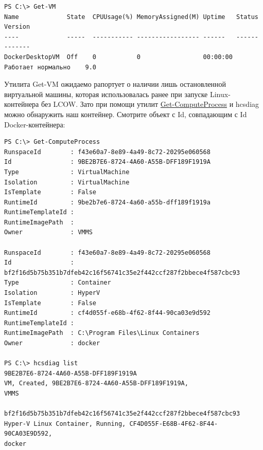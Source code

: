 \documentclass[14pt, a4paper]{article}
\begin{document}
\begin{lstlisting}[basicstyle=\fontsize{8}{13}\selectfont\ttfamily, numberstyle=\color{152, 104, 1}]
PS C:\> Get-VM
Name             State  CPUUsage(%) MemoryAssigned(M) Uptime   Status             Version
----             -----  ----------- ----------------- ------   ------             -------
DockerDesktopVM  Off    0           0                 00:00:00 Работает нормально    9.0
\end{lstlisting}

Утилита Get-VM ожидаемо рапортует о наличии лишь остановленной виртуальной машины, которая
использовалась ранее при запуске Linux-контейнера без LCOW. Зато при помощи утилит
\href{https://docs.microsoft.com/en-us/powershell/module/hostcomputeservice/get-computeprocess}{Get-ComputeProcess} и hcsdiag можно обнаружить наш контейнер. Смотрите объект с Id, совпадающим
с Id Docker-контейнера:

\begin{lstlisting}
PS C:\> Get-ComputeProcess
RunspaceId        : f43e60a7-8e89-4a49-8c72-20295e060568 
Id                : 9BE2B7E6-8724-4A60-A55B-DFF189F1919A
Type              : VirtualMachine
Isolation         : VirtualMachine
IsTemplate        : False
RuntimeId         : 9be2b7e6-8724-4a60-a55b-dff189f1919a 
RuntimeTemplateId :
RuntimeImagePath  : 
Owner             : VMMS

RunspaceId        : f43e60a7-8e89-4a49-8c72-20295e060568 
Id                : bf2f16d5b75b351b7dfeb42c16f56741c35e2f442ccf287f2bbece4f587cbc93 
Type              : Container
Isolation         : HyperV
IsTemplate        : False
RuntimeId         : cf4d055f-e68b-4f62-8f44-90ca03e9d592 
RuntimeTemplateId :
RuntimeImagePath  : C:\Program Files\Linux Containers 
Owner             : docker

PS C:\> hcsdiag list
9BE2B7E6-8724-4A60-A55B-DFF189F1919A
VM, Created, 9BE2B7E6-8724-4A60-A55B-DFF189F1919A,
VMMS

bf2f16d5b75b351b7dfeb42c16f56741c35e2f442ccf287f2bbece4f587cbc93
Hyper-V Linux Container, Running, CF4D055F-E68B-4F62-8F44-90CA03E9D592,
docker
\end{lstlisting}
\end{document}
